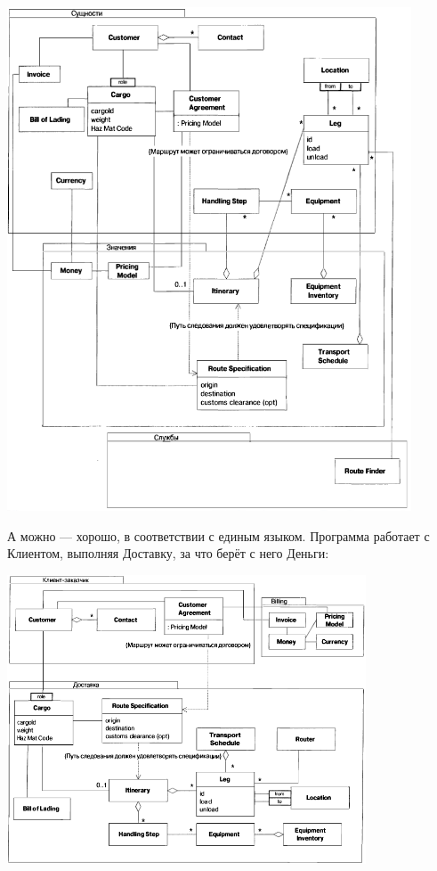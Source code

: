 \documentclass[a5paper]{article}
\begin{document}
\begin{center}
    \includegraphics[width=0.9\textwidth]{cargoModulesBad.png}
\end{center}

А можно --- хорошо, в соответствии с единым языком. Программа работает с Клиентом, выполняя Доставку, за что берёт с него Деньги:

\begin{center}
    \includegraphics[width=0.8\textwidth]{cargoModulesGood.png}
\end{center}
\end{document}
